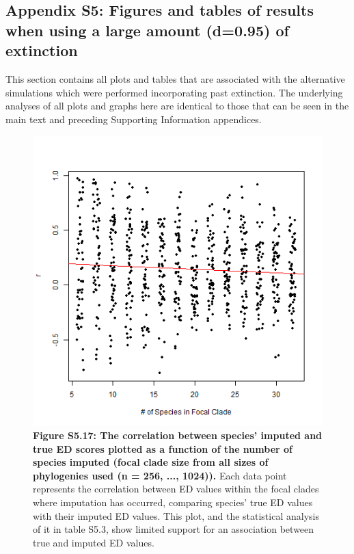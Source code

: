\documentclass[10pt,english]{article}
\begin{document}
\clearpage
\subsection*{Appendix S5: Figures and tables of results when using a large amount (d=0.95) of extinction}

This section contains all plots and tables that are associated with the
alternative simulations which were performed incorporating past extinction. The
underlying analyses of all plots and graphs here are identical to those that can
be seen in the main text and preceding Supporting Information appendices.

\begin{figure}[!ht]
  \center
  \includegraphics[width=.5\textwidth]{../figures/edModelHighExtinction.png}
  \caption{\textbf{Figure S5.17: The correlation between species' imputed and
      true ED scores plotted as a function of the number of species imputed
      (focal clade size from all sizes of phylogenies used (n = 256, ...,
      1024)).} Each data point represents the correlation between ED values
      within the focal clades where imputation has occurred, comparing species'
      true ED values with their imputed ED values. This plot, and the
      statistical analysis of it in table S5.3, show limited support for an
      association between true and imputed ED values.}
\end{figure}
\end{document}
